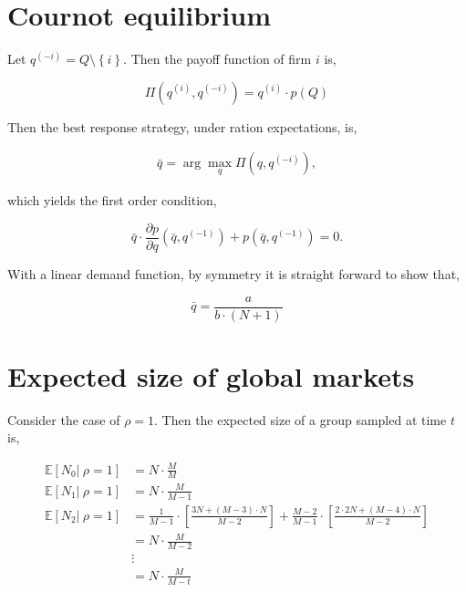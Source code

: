 \documentclass[american]{scrartcl}
\newcommand{\set}[1]{\left\{#1\right\}}
\newcommand{\E}{\mathbb{E}}
\begin{document}
\newpage
\nocite{*}
\printbibliography

\newpage
\appendix

\section{Cournot equilibrium} \label{A:cournot}

Let $q^{(-i)} = Q \setminus \set{i}$. Then the payoff function of firm $i$ is,

\begin{equation*}
    \Pi\left(q^{(i)}, q^{(-i)} \right) = q^{(i)} \cdot p(Q)
\end{equation*}

Then the best response strategy, under ration expectations, is,

\begin{equation*}
    \begin{split}
        \bar{q} = \arg\max_{q} \Pi\left(q, q^{(-i)} \right),
    \end{split}
\end{equation*}

which yields the first order condition,

\begin{equation*}
    \bar{q} \cdot \frac{ \partial p}{\partial q}\left(\bar{q}, q^{(-1)}\right) + p\left(\bar{q}, q^{(-1)}\right) = 0.
\end{equation*}

With a linear demand function, by symmetry it is straight forward to show that,

\begin{equation*}
    \bar{q} = \frac{a}{b \cdot (N+1)}
\end{equation*}

\section{Expected size of global markets} \label{A:exp_size}

Consider the case of $\rho = 1$. Then the expected size of a group sampled at time $t$ is,

\begin{equation*}
    \begin{split}
        \E[N_0 \vert \ \rho = 1] &= N \cdot \frac{M}{M} \\
        \E[N_1 \vert \ \rho = 1] &=  N \cdot \frac{M}{M-1}  \\
        \E[N_2 \vert \ \rho = 1] &=  \frac{1}{M-1} \cdot \left[ \frac{3N + (M-3) \cdot N}{M-2} \right] + \frac{M-2}{M-1} \cdot \left[ \frac{2 \cdot 2N + (M-4) \cdot N}{M-2} \right] \\ &= N \cdot \frac{M}{M-2} \\
        &\vdots \\
        &= N \cdot \frac{M}{M-t}
    \end{split}
\end{equation*}
\end{document}
